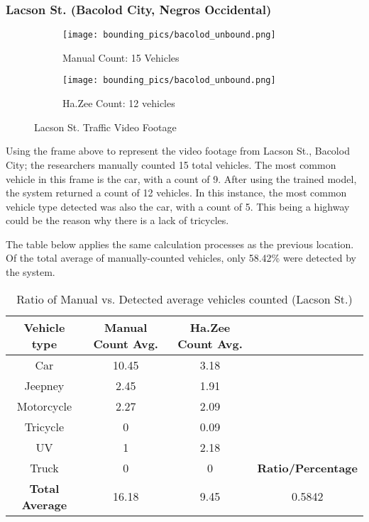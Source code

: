 \subsubsection{Lacson St. (Bacolod City, Negros Occidental)
}


\begin{figure}
	\begin{subfigure}{.5\textwidth}
		\centering
		\texttt{[image: bounding\_pics/bacolod\_unbound.png]}
		\caption{Manual Count: 15 Vehicles}
		
	\end{subfigure}%
	\begin{subfigure}{.5\textwidth}
		\centering
		\texttt{[image: bounding\_pics/bacolod\_unbound.png]}
		\caption{Ha.Zee Count: 12 vehicles}
	\end{subfigure}
	\caption{Lacson St. Traffic Video Footage}
\end{figure}
Using the frame above to represent the video footage from Lacson St., Bacolod City; the researchers manually counted 15 total vehicles. The most common vehicle in this frame is the car, with a count of 9. After using the trained model, the system returned a count of 12 vehicles. In this instance, the most common vehicle type detected was also the car, with a count of 5. This being a highway could be the reason why there is a lack of tricycles.

The table below applies the same calculation processes as the previous location. Of the total average of manually-counted vehicles, only 58.42\% were detected by the system. 



\begin{table}[ht]   %
	\centering
	\caption{Ratio of Manual vs. Detected average vehicles counted  (Lacson St.)} \vspace{0.25em}
	\begin{tabular}{|c|c|c|c|} \hline
		\centering \textbf {Vehicle type} & Manual Count Avg. & Ha.Zee Count Avg.	&  \\ \hline
		Car & 10.45 & 3.18  &   \\ \hline
		Jeepney & 2.45 & 1.91  &	\\ \hline
		Motorcycle& 2.27  & 2.09  & \\ \hline
		Tricycle   & 0  & 0.09 & \\ \hline
		UV & 1 & 2.18 & \\ \hline
		Truck & 0 & 0 & \textbf{Ratio/Percentage}\\ \hline
		
		\textbf{Total Average} & 16.18 & 9.45 & 0.5842 \\ \hline
		
	\end{tabular}
	\label{tab:lacson_st}
\end{table}

